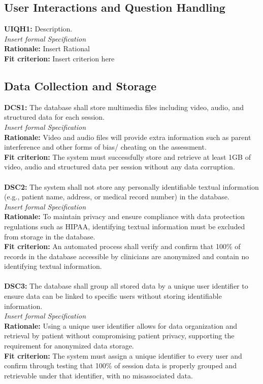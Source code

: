 \documentclass[12pt]{article}
\begin{document}
\subsection{User Interactions and Question Handling}
\textbf{UIQH1: } Description.\\
\textit{Insert formal Specification}\\
\textbf{Rationale: } Insert Rational\\
\textbf{Fit criterion: } Insert criterion here 

\subsection{Data Collection and Storage}
\textbf{DCS1: }The database shall store multimedia files including video, audio, and structured data for 
each session.\\
\textit{Insert formal Specification}\\
\textbf{Rationale: }Video and audio files will provide extra information such as parent interference and 
other forms of bias/ cheating on the assessment.\\
\textbf{Fit criterion: }The system must successfully store and retrieve at least 1GB of video, audio and 
structured data per session without any data corruption. \\\\
\textbf{DSC2: }The system shall not store any personally identifiable textual information (e.g., patient name, 
address, or medical record number) in the database.\\
\textit{Insert formal Specification}\\
\textbf{Rationale: }To maintain privacy and ensure compliance with data protection regulations such as HIPAA, 
identifying textual information must be excluded from storage in the database.\\
\textbf{Fit criterion: }An automated process shall verify and confirm that 100\% of records in the database 
accessible by clinicians are anonymized and contain no identifying textual information.\\\\
\textbf{DSC3: }The database shall group all stored data by a unique user identifier to ensure data can be linked 
to specific users without storing identifiable information.\\
\textit{Insert formal Specification}\\
\textbf{Rationale: }Using a unique user identifier allows for data organization and retrieval by patient without 
compromising patient privacy, supporting the requirement for anonymized data storage.\\
\textbf{Fit criterion: }The system must assign a unique identifier to every user and confirm through testing 
that 100\% of session data is properly grouped and retrievable under that identifier, with no misassociated 
data.\\\\
\end{document}
